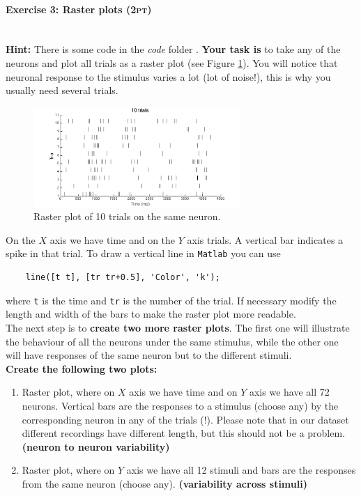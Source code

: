 \documentclass[a4paper,11pt]{article}
\newenvironment{exercise}[3]{\paragraph{Exercise #1: #2 \textsc{(#3pt)}}\ \\}{
\medskip}
\begin{document}
\begin{exercise}{3}{Raster plots}{2}
\textbf{Hint: } There is some code in the \emph{code} folder .
\textbf{Your task is} to take any of the neurons and plot all trials as a raster plot (see Figure \ref{fig:raster_plot}). You will notice that neuronal response to the stimulus varies a lot (lot of noise!), this is why you usually need several trials.
\begin{figure}[H]
   \centering
   \includegraphics[width=0.7\textwidth]{raster10tr.png} 
   \caption{Raster plot of 10 trials on the same neuron.}
   \label{fig:raster_plot}
\end{figure}
On the $X$ axis we have time and on the $Y$ axis trials. A vertical bar indicates a spike in that trial. To draw a vertical line in \texttt{Matlab} you can use
\begin{verbatim}
	line([t t], [tr tr+0.5], 'Color', 'k');
\end{verbatim}
where \texttt{t} is the time and \texttt{tr} is the number of the trial. If necessary modify the length and width of the bars to make the raster plot more readable.
\ \\

The next step is to \textbf{create two more raster plots}. The first one will illustrate the behaviour of all the neurons under the same stimulus, while the other one will have responses of the same neuron but to the different stimuli.\\

\textbf{Create the following two plots:} 
\begin{enumerate}
	\item Raster plot, where on $X$ axis we have time and on $Y$ axis we have all 72 neurons. Vertical bars are the responses to a stimulus (choose any) by the corresponding neuron in any of the trials (!). Please note that in our dataset different recordings have different length, but this should not be a problem. \textbf{(neuron to neuron variability)}
	\item Raster plot, where on $Y$ axis we have all 12 stimuli and bars are the responses from the same neuron (choose any). \textbf{(variability across stimuli)}
\end{enumerate}


\end{exercise}
\end{document}
